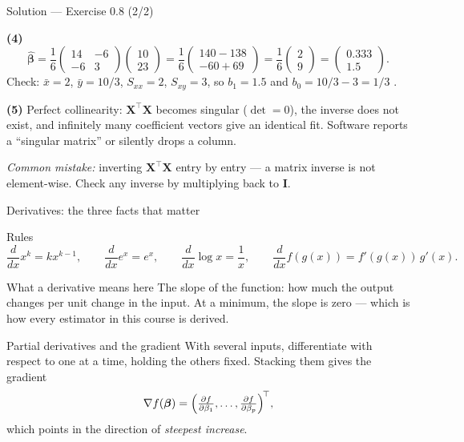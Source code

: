 \documentclass[aspectratio=169,11pt]{beamer}
\begin{document}
\begin{frame}{Solution --- Exercise 0.8 (2/2)}
  \begin{solutionbox}
    \textbf{(4)}
    \[
      \hat{\boldsymbol\beta} = \frac{1}{6}
      \begin{pmatrix} 14 & -6 \\ -6 & 3\end{pmatrix}
      \begin{pmatrix} 10 \\ 23 \end{pmatrix}
      = \frac{1}{6}\begin{pmatrix} 140-138 \\ -60+69 \end{pmatrix}
      = \frac{1}{6}\begin{pmatrix} 2 \\ 9 \end{pmatrix}
      = \begin{pmatrix} 0.333 \\ 1.5 \end{pmatrix}.
    \]
    Check: $\bar x = 2$, $\bar y = 10/3$, $S_{xx} = 2$, $S_{xy} = 3$, so
    $b_1 = 1.5$ \checkmark and $b_0 = 10/3 - 3 = 1/3$ \checkmark.

    \textbf{(5)} Perfect collinearity: $\mathbf{X}^\top\mathbf{X}$ becomes
    singular ($\det = 0$), the inverse does not exist, and infinitely many
    coefficient vectors give an identical fit. Software reports a ``singular
    matrix'' or silently drops a column.

    \textit{Common mistake:} inverting $\mathbf{X}^\top\mathbf{X}$ entry by
    entry --- a matrix inverse is not element-wise. Check any inverse by
    multiplying back to $\mathbf{I}$.
  \end{solutionbox}
\end{frame}

\begin{frame}{Derivatives: the three facts that matter}
  \footnotesize
  \begin{block}{Rules}
    \[
      \frac{d}{dx}x^k = kx^{k-1},
      \qquad
      \frac{d}{dx}e^x = e^x,
      \qquad
      \frac{d}{dx}\log x = \frac1x,
      \qquad
      \frac{d}{dx}f(g(x)) = f'(g(x))\,g'(x).
    \]
  \end{block}
  \begin{block}{What a derivative means here}
    The slope of the function: how much the output changes per unit change
    in the input. At a minimum, the slope is zero --- which is how every
    estimator in this course is derived.
  \end{block}
  \begin{block}{Partial derivatives and the gradient}
    With several inputs, differentiate with respect to one at a time,
    holding the others fixed. Stacking them gives the gradient
    \[
      \nabla f(\boldsymbol\beta)
      = \Bigl(\tfrac{\partial f}{\partial \beta_1}, \dots,
              \tfrac{\partial f}{\partial \beta_p}\Bigr)^{\!\top},
    \]
    which points in the direction of \emph{steepest increase}.
  \end{block}
\end{frame}
\end{document}
